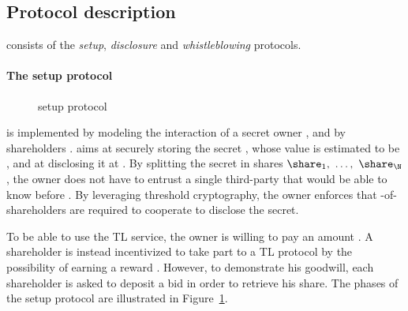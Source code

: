 \subsection{Protocol description}

\shortname consists of the {\em setup},  {\em disclosure} and  {\em whistleblowing} protocols.

\paragraph{The setup protocol}

\begin{figure}[t]
\centering
{}
\caption{\shortname setup protocol}
\label{protocol:setup}
\end{figure}

\shortname is implemented by modeling the interaction of a secret owner \owner, and by \N shareholders \shareholder. \owner aims at securely storing the secret \secret, whose value is estimated to be \V, and at disclosing it at \td.
%
By splitting the secret \secret in \N shares $\share_{1},\ \ldots,\ \share_{\N}$, the owner does not have to entrust a single third-party that would be able to know \secret before \td. By leveraging threshold cryptography, the owner enforces that \K-of-\N shareholders are required to cooperate to disclose the secret.

To be able to use the TL service, the owner is willing to pay an amount \PO. A shareholder \shareholder is instead incentivized to take part to a TL protocol by the possibility of earning a reward \RH. However, to demonstrate his goodwill, each shareholder is asked to deposit a bid \BH in order to retrieve his share.
%
The phases of the setup protocol are illustrated in Figure~\ref{protocol:setup}.


